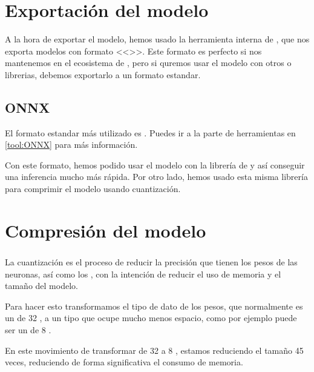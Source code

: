 
\section{Exportación del modelo}

A la hora de exportar el modelo, hemos usado la herramienta interna de , que nos exporta modelos con formato <<>>. Este formato es perfecto si nos mantenemos en el ecosistema de , pero si quremos usar el modelo con otros  o librerias, debemos exportarlo a un formato estandar.

\subsection{ONNX}

El formato estandar más utilizado es . Puedes ir a la parte de herramientas en \ref{tool:ONNX} para más información.

Con este formato, hemos podido usar el modelo con la librería de  y así conseguir una inferencia mucho más rápida. Por otro lado, hemos usado esta misma librería para comprimir el modelo usando cuantización.


\section{Compresión del modelo}

\subsubsection{}

La cuantización es el proceso de reducir la precisión que tienen los pesos de las neuronas, así como los , con la intención de reducir el uso de memoria y el tamaño del modelo.


Para hacer esto transformamos el tipo de dato de los pesos, que normalmente es un  de 32 , a un tipo que ocupe mucho menos espacio, como por ejemplo puede ser un  de 8 .

En este movimiento de transformar de 32 a 8 , estamos reduciendo el tamaño 45 veces, reduciendo de forma significativa el consumo de memoria.

